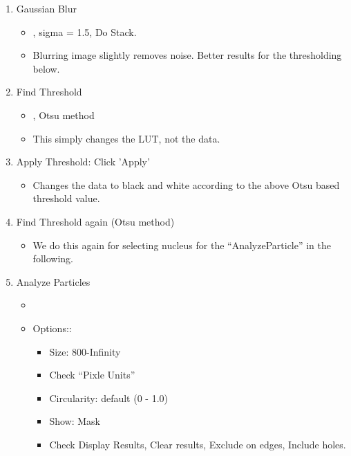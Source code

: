 \begin{enumerate}
  \item Gaussian Blur

\begin{itemize}
    \item {}, sigma = 1.5, Do Stack.
    \item Blurring image slightly removes noise. Better results for the thresholding below.  
  
\end{itemize}
  \item Find Threshold

\begin{itemize}
    \item {},  Otsu method
    \item This simply changes the LUT, not the data. 
  
\end{itemize}
  \item Apply Threshold: Click 'Apply'

\begin{itemize}
    \item Changes the data to black and white according to the above Otsu based threshold value. 
  
\end{itemize}
  \item Find Threshold again (Otsu method)

\begin{itemize}
    \item We do this again for selecting nucleus for the ``AnalyzeParticle'' in the following.
  
\end{itemize}
  \item Analyze Particles

\begin{itemize}
    \item {}
    \item Options::

\begin{itemize}
      \item Size: 800-Infinity
      \item Check ``Pixle Units''
      \item Circularity: default (0 - 1.0)
      \item Show: Mask
      \item Check Display Results, Clear results, Exclude on edges, Include holes. 
    

\end{itemize}
\end{itemize}
\end{enumerate}
